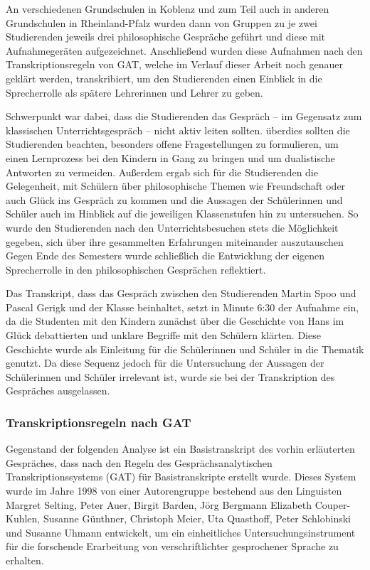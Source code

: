 An verschiedenen Grundschulen in Koblenz und zum Teil auch in anderen Grundschulen in Rheinland-Pfalz wurden dann von Gruppen zu je zwei Studierenden jeweils drei philosophische Gespräche geführt und diese mit Aufnahmegeräten aufgezeichnet. 
Anschließend wurden diese Aufnahmen nach den Transkriptionsregeln von GAT, welche im Verlauf dieser Arbeit noch genauer geklärt werden, transkribiert, um den Studierenden einen Einblick in die Sprecherrolle als spätere Lehrerinnen und Lehrer zu geben. 

Schwerpunkt war dabei, dass die Studierenden das Gespräch -- im Gegensatz zum klassischen Unterrichtsgespräch -- nicht aktiv leiten sollten. 
überdies sollten die Studierenden beachten, besonders offene Fragestellungen zu formulieren, um einen Lernprozess bei den Kindern in Gang zu bringen und um dualistische Antworten zu vermeiden. 
Außerdem ergab sich für die Studierenden die Gelegenheit, mit Schülern über philosophische Themen wie Freundschaft oder auch Glück ins Gespräch zu kommen und die Aussagen der Schülerinnen und Schüler auch im Hinblick auf die jeweiligen Klassenstufen hin zu untersuchen. 
So wurde den Studierenden nach den Unterrichtsbesuchen stets die Möglichkeit gegeben, sich über ihre gesammelten Erfahrungen miteinander auszutauschen
Gegen Ende des Semesters wurde schließlich die Entwicklung der eigenen Sprecherrolle in den philosophischen Gesprächen reflektiert.

Das Transkript, dass das Gespräch zwischen den Studierenden Martin Spoo und Pascal Gerigk und der Klasse beinhaltet, setzt in Minute 6:30 der Aufnahme ein, da die Studenten mit den Kindern zunächst über die Geschichte von Hans im Glück debattierten und unklare Begriffe mit den Schülern klärten. 
Diese Geschichte wurde als Einleitung für die Schülerinnen und Schüler in die Thematik genutzt.
Da diese Sequenz jedoch für die Untersuchung der Aussagen der Schülerinnen und Schüler irrelevant ist, wurde sie bei der Transkription des Gespräches ausgelassen.


\subsubsection{Transkriptionsregeln nach GAT}

Gegenstand der folgenden Analyse ist ein Basistranskript des vorhin erläuterten Gespräches, dass nach den Regeln des Gesprächsanalytischen Transkriptionssystems (GAT) für Basistranskripte erstellt wurde. 
Dieses System wurde im Jahre 1998 von einer Autorengruppe bestehend aus den Linguisten Margret Selting, Peter Auer, Birgit Barden, Jörg Bergmann Elizabeth Couper-Kuhlen, Susanne Günthner, Christoph Meier, Uta Quasthoff, Peter Schlobinski und Susanne Uhmann entwickelt, um ein einheitliches Untersuchungsinstrument für die forschende Erarbeitung von verschriftlichter gesprochener Sprache zu erhalten. 

